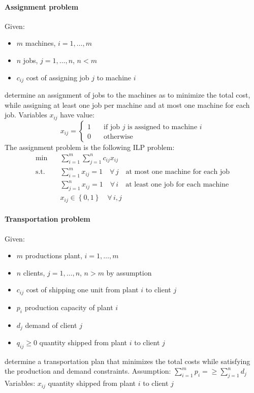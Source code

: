\paragraph*{Assignment problem}
Given:
\begin{itemize}
    \item $m$ machines, $i = 1, \dots, m$
    \item $n$ jobs, $j = 1, \dots, n$, $n < m$
    \item $c_{ij}$ cost of assigning job $j$ to machine $i$
\end{itemize}
determine an assignment of jobs to the machines as to minimize the total cost, while assigning at least one job per machine and at most one machine for each job.
Variables $x_{ij}$ have value:
\[ x_{ij} = \begin{cases}
    1 \quad & \text{if job } j \text{ is assigned to machine } i \\
    0 \quad & \text{otherwise}
\end{cases} \]
The assignment problem is the following ILP problem:
\begin{align*}
\min        & \quad \sum_{i=1}^m \sum_{j=1}^n c_{ij} x_{ij}                                                      \\
\text{s.t.} & \quad \sum_{i=1}^{m} x_{ij} = 1 \quad \forall \, j \quad \text{at most one machine for each job}   \\
            & \quad \sum_{j=1}^{n} x_{ij} = 1 \quad \forall \, i  \quad \text{at least one job for each machine} \\
            & \quad x_{ij} \in \left\{ 0, 1 \right\} \quad \forall \, i, j
\end{align*}

\paragraph*{Transportation problem}
Given:
\begin{itemize}
\item $m$ productions plant, $i = 1, \dots, m$
\item $n$ clients, $j = 1, \dots, n$, $n > m$ by assumption
\item $c_{ij}$ cost of shipping one unit from plant $i$ to client $j$
\item $p_i$ production capacity of plant $i$
\item $d_j$ demand of client $j$
\item $q_{ij} \geq 0$ quantity shipped from plant $i$ to client $j$
\end{itemize}
determine a transportation plan that minimizes the total costs while satisfying the production and demand constraints.
Assumption: $\displaystyle \sum_{i=1}^m p_i = \geq \sum_{j=1}^{n} d_j$
Variables: $x_{ij}$ quantity shipped from plant $i$ to client $j$

